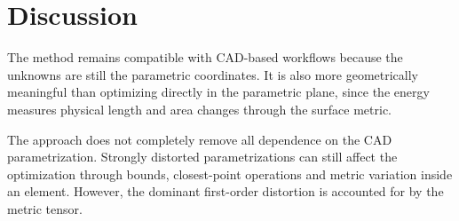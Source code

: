 \documentclass[11pt]{article}
\begin{document}
\section{Discussion}

The method remains compatible with CAD-based workflows because the unknowns are
still the parametric coordinates. It is also more geometrically meaningful than
optimizing directly in the parametric plane, since the energy measures physical
length and area changes through the surface metric.

The approach does not completely remove all dependence on the CAD
parametrization. Strongly distorted parametrizations can still affect the
optimization through bounds, closest-point operations and metric variation
inside an element. However, the dominant first-order distortion is accounted for
by the metric tensor.
\end{document}
